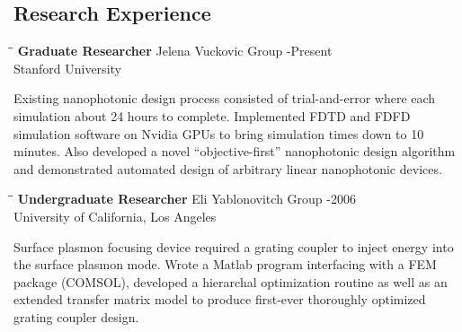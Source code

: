 \documentclass{res}
\begin{document}
\begin{resume}
\section{Research Experience}
   \vspace{-0.1in}	
   \begin{tabbing}
   \hspace{2.3in}\= \hspace{2.6in}\= \kill %
    {\bf Graduate Researcher} \>Jelena Vuckovic Group -Present\\
                             \>Stanford University
   \end{tabbing}\vspace{-20pt}      %
    Existing nanophotonic design process consisted of trial-and-error
        where each simulation about 24 hours to complete.
    Implemented FDTD and FDFD simulation software on Nvidia GPUs to bring 
        simulation times down to 10 minutes.
    Also developed a novel ``objective-first'' nanophotonic design algorithm
        and demonstrated automated design of arbitrary linear nanophotonic 
        devices.
   \begin{tabbing}
   \hspace{2.3in}\= \hspace{2.6in}\= \kill %
    {\bf Undergraduate Researcher} \>Eli Yablonovitch Group -2006\\
                          \>University of California, Los Angeles
   \end{tabbing}\vspace{-20pt}
    Surface plasmon focusing device required a grating coupler to inject energy
        into the surface plasmon mode.
    Wrote a Matlab program interfacing with a FEM package (COMSOL),
        developed a hierarchal optimization routine as well as an extended 
        transfer matrix model to produce first-ever thoroughly optimized 
        grating coupler design.
   
\end{resume}
\end{document}
